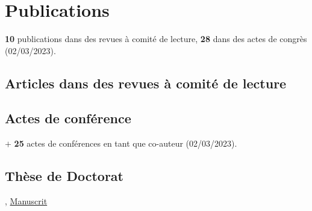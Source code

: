 \section{Publications}
\textbf{10} publications dans des revues à comité de lecture, \textbf{28} dans des actes de congrès (02/03/2023).

\subsection{Articles dans des revues à comité de lecture}

\tabitem {}

\tabitem {}

\tabitem {}

\tabitem {}

\tabitem {}

\tabitem {}

\tabitem {}

\tabitem {}

\tabitem {}

\tabitem {}

\subsection{Actes de conférence}
\tabitem {}

\tabitem {}

\tabitem {}

$+$ \textbf{25} actes de conférences en tant que co-auteur (02/03/2023).

\subsection{Thèse de Doctorat}
, \href{https://raw.githubusercontent.com/fkeruzore/PhDThesis-public/main/manuscrit.pdf}{Manuscrit}
